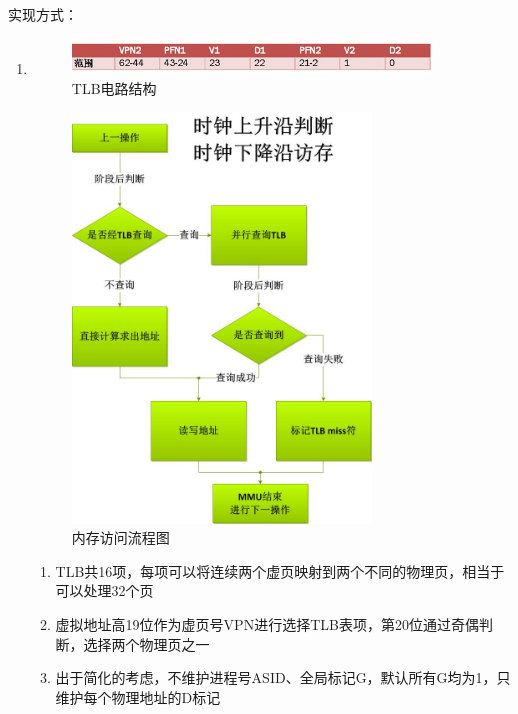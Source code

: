             实现方式：
            \begin{enumerate}
            \item
                \begin{figure}[!hbp]
                    \centering
                    \caption{TLB电路结构}
                    \includegraphics[width=0.9\textwidth]{picture/TLB.jpg}
                \end{figure}

                \begin{figure}[!hbp]
                    \centering
                    \caption{内存访问流程图}
                    \includegraphics[width=0.75\textwidth]{picture/Memory.jpg}
                \end{figure}
                
                \begin{enumerate}
                \item
                    TLB共16项，每项可以将连续两个虚页映射到两个不同的物理页，相当于可以处理32个页
                \item
                    虚拟地址高19位作为虚页号VPN进行选择TLB表项，第20位通过奇偶判断，选择两个物理页之一
                \item
                    出于简化的考虑，不维护进程号ASID、全局标记G，默认所有G均为1，只维护每个物理地址的D标记
                \end{enumerate}


\end{enumerate}
